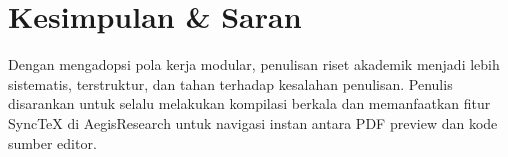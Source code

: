 \section{Kesimpulan \& Saran}
\label{sec:penutup}
Dengan mengadopsi pola kerja modular, penulisan riset akademik menjadi lebih sistematis, terstruktur, dan tahan terhadap kesalahan penulisan. Penulis disarankan untuk selalu melakukan kompilasi berkala dan memanfaatkan fitur SyncTeX di AegisResearch untuk navigasi instan antara PDF preview dan kode sumber editor.
